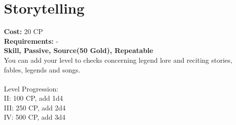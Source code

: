 \section{Storytelling}
\textbf{Cost:} 20 CP\\
\textbf{Requirements:} -\\
\textbf{Skill, Passive, Source(50 Gold), Repeatable}\\
You can add your level to checks concerning legend lore and reciting stories, fables, legends and songs.\\ 
\\
Level Progression:\\
II: 100 CP, add 1d4\\
III: 250 CP, add 2d4\\
IV: 500 CP, add 3d4\\